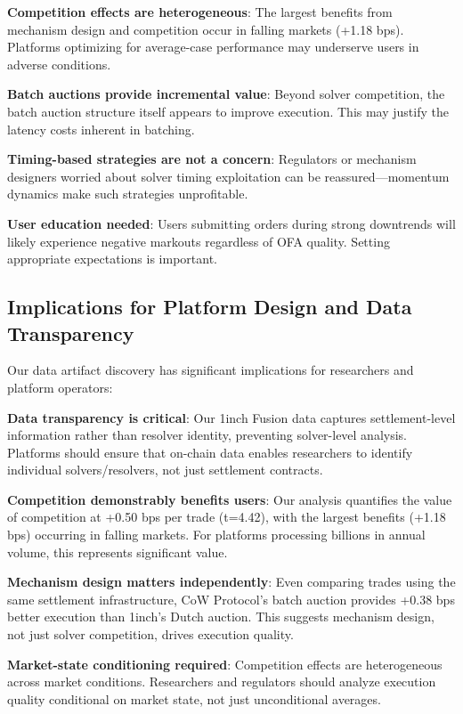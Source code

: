 \documentclass[12pt,a4paper]{article}
\begin{document}
\textbf{Competition effects are heterogeneous}: The largest benefits from mechanism design and competition occur in falling markets (+1.18 bps). Platforms optimizing for average-case performance may underserve users in adverse conditions.

\textbf{Batch auctions provide incremental value}: Beyond solver competition, the batch auction structure itself appears to improve execution. This may justify the latency costs inherent in batching.

\textbf{Timing-based strategies are not a concern}: Regulators or mechanism designers worried about solver timing exploitation can be reassured---momentum dynamics make such strategies unprofitable.

\textbf{User education needed}: Users submitting orders during strong downtrends will likely experience negative markouts regardless of OFA quality. Setting appropriate expectations is important.

\subsection{Implications for Platform Design and Data Transparency}

Our data artifact discovery has significant implications for researchers and platform operators:

\textbf{Data transparency is critical}: Our 1inch Fusion data captures settlement-level information rather than resolver identity, preventing solver-level analysis. Platforms should ensure that on-chain data enables researchers to identify individual solvers/resolvers, not just settlement contracts.

\textbf{Competition demonstrably benefits users}: Our analysis quantifies the value of competition at +0.50 bps per trade (t=4.42), with the largest benefits (+1.18 bps) occurring in falling markets. For platforms processing billions in annual volume, this represents significant value.

\textbf{Mechanism design matters independently}: Even comparing trades using the same settlement infrastructure, CoW Protocol's batch auction provides +0.38 bps better execution than 1inch's Dutch auction. This suggests mechanism design, not just solver competition, drives execution quality.

\textbf{Market-state conditioning required}: Competition effects are heterogeneous across market conditions. Researchers and regulators should analyze execution quality conditional on market state, not just unconditional averages.
\end{document}
